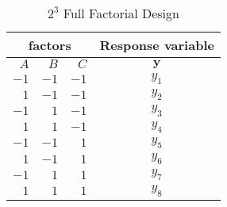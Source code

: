 \documentclass{beamer}
\begin{document}
\begin{frame}

\begin{table}
\caption{$2^{3}$ Full Factorial Design}
\begin{tabular}{rrr|>{\onslide<1>}c<{\onslide}}
\multicolumn{3}{c}{factors} & Response variable\\ \hline
$A$&$B$&$C$&$\mathbf{y}$\\ \hline
$-1$ & $-1$ & $-1$  &$y_{1}$\\ 
$1$ &  $-1$ & $-1$ &$y_{2}$   \\ 
$-1$ & $1$ & $-1$&$y_{3}$    \\ 
$1$ &  $1$ & $-1$&$y_{4}$ \\
$-1$ & $-1$ & $1$&$y_{5}$\\
$1$ &  $-1$ & $1$ & $y_{6}$\\
$-1$ & $1$ & $1$&$y_{7}$\\
$1$ &  $1$ &  $1$&$y_{8}$\\
\end{tabular}
\pause
\end{table}

\end{frame}
\end{document}
